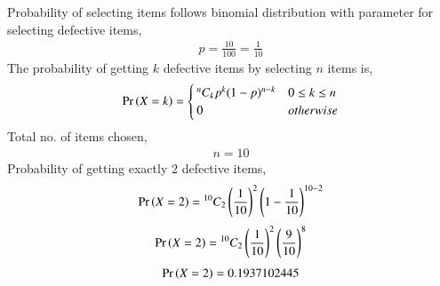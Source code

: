 

Probability of selecting items follows binomial distribution with parameter for selecting defective items,
\begin{align}
    p=\frac{10}{100}=\frac{1}{10}
\end{align}
The probability of getting $k$ defective items by selecting $n$ items is,
\begin{align}
   \Pr\left(X=k\right) =
  \begin{cases}
    {^n C_k}p^{k}(1-p)^{n-k} & 0 \leq k \leq n\\
      0 & otherwise
  \end{cases}
\end{align}
Total no. of items chosen,
\begin{align}
    n=10
\end{align}
Probability of getting exactly $2$ defective items,
\begin{align}
    \Pr\left(X=2\right)={^{10} C_2}\left(\frac{1}{10}\right)^{2}\left(1-\frac{1}{10}\right)^{10-2}
\end{align}
\begin{align}
    \Pr\left(X=2\right)={^{10} C_2}\left(\frac{1}{10}\right)^{2}\left(\frac{9}{10}\right)^{8}
\end{align}
\begin{align}
    \Pr\left(X=2\right)=0.1937102445
\end{align}